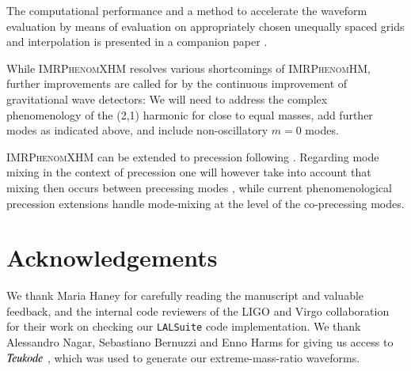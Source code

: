 \documentclass[twocolumn,prd,aps,superscriptaddress,preprintnumbers,tightenlines,showpacs,nofootinbib,eqsecnum,amsfonts,amsmath]{revtex4}
\newcommand{\phHM}{\textsc{IMRPhenomHM}\xspace}
\newcommand{\phXHM}{\textsc{IMRPhenomXHM}\xspace}
\begin{document}
The computational performance and a method to accelerate the waveform evaluation by means of evaluation on appropriately chosen unequally spaced grids and interpolation is presented in a companion paper \cite{our_mb}.

While \phXHM resolves various shortcomings of \phHM, further improvements are called for by the continuous improvement of gravitational wave detectors: 
We will need to address the complex phenomenology of the (2,1) harmonic for close to equal masses, add further modes as indicated above, and include non-oscillatory $m=0$ modes.

\phXHM can be extended to precession following \cite{Hannam:2013oca,PhenomPv2,Khan:2018fmp}. Regarding mode mixing in the context of precession one will however take into account that mixing then occurs between precessing modes \cite{ToniPrecession}, while current phenomenological precession extensions handle mode-mixing at the level of the co-precessing modes. 


\section*{Acknowledgements} 

We thank Maria Haney for carefully reading the manuscript and valuable feedback, and the internal code reviewers of the LIGO and Virgo collaboration
for their work on checking our \texttt{LALSuite} code implementation.
%
We thank Alessandro Nagar, Sebastiano Bernuzzi and Enno Harms for giving us access to $\it{Teukode}$ \cite{Harms_2014}, which was used to generate our extreme-mass-ratio waveforms. 
\end{document}
